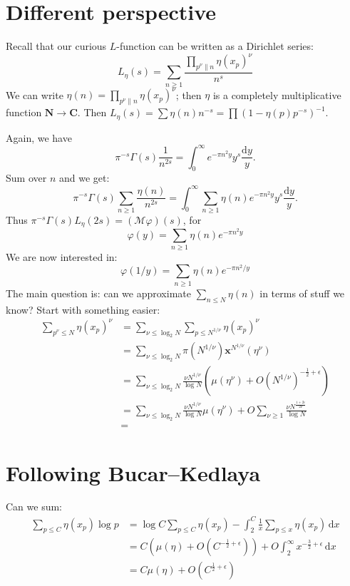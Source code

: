 \documentclass{article}
\newcommand{\bC}{\mathbf{C}}
\newcommand{\bN}{\mathbf{N}}
\newcommand{\bx}{\boldsymbol{x}}
\newcommand{\cM}{\mathcal{M}}
\newcommand{\dd}{\mathrm{d}}
\theoremstyle{definition}
\begin{document}
\section{Different perspective}

Recall that our curious $L$-function can be written as a Dirichlet series:
\[
	L_\eta(s) = \sum_{n\geqslant 1} \frac{\prod_{p^\nu \| n} \eta(x_p)^\nu}{n^s}
\]
We can write $\eta(n) = \prod_{p^\nu\| n} \eta(x_p)^\nu$; then $\eta$ is a 
completely multiplicative function $\bN\to \bC$. Then 
$L_\eta(s) = \sum \eta(n) n^{-s} = \prod (1-\eta(p) p^{-s})^{-1}$. 

Again, we have 
\[
	\pi^{-s} \Gamma(s) \frac{1}{n^{2s}} = \int_0^\infty e^{-\pi n^2 y} y^{s} \frac{\dd y}{y} .
\]
Sum over $n$ and we get:
\[
	\pi^{-s} \Gamma(s) \sum_{n\geqslant 1} \frac{\eta(n)}{n^{2s}} =  \int_0^\infty\sum_{n\geqslant 1} \eta(n) e^{-\pi n^2 y} y^{s} \frac{\dd y}{y} .
\]
Thus $\pi^{-s} \Gamma(s) L_\eta(2s) = (\cM\varphi)(s)$, for 
\[
	\varphi(y) = \sum_{n\geqslant 1} \eta(n) e^{-\pi n^2 y}
\]
We are now interested in:
\[
	\varphi(1/y) = \sum_{n\geqslant 1} \eta(n) e^{-\pi n^2 / y}
\]
The main question is: can we approximate $\sum_{n\leqslant N} \eta(n)$ in terms 
of stuff we know? Start with something easier:
\begin{align*}
	\sum_{p^\nu\leqslant N} \eta(x_p)^\nu
		&= \sum_{\nu\leqslant \log_2 N} \sum_{p\leqslant N^{1/\nu}} \eta(x_p)^\nu \\
		&= \sum_{\nu\leqslant \log_2 N} \pi(N^{1/\nu}) \bx^{N^{1/\nu}}(\eta^\nu) \\
		&= \sum_{\nu\leqslant \log_2 N} \frac{\nu N^{1/\nu}}{\log N} (\mu(\eta^\nu)+O(N^{1/\nu})^{-\frac 1 2+\epsilon}) \\
		&= \sum_{\nu\leqslant \log_2 N} \frac{\nu N^{1/\nu}}{\log N} \mu(\eta^\nu) + O \sum_{\nu\geqslant 1} \frac{\nu N^{\frac{1+2\epsilon}{2\nu}}}{\log N} \\
		&=
\end{align*}





\section{Following Bucar--Kedlaya}

Can we sum:
\begin{align*}
	\sum_{p\leqslant C} \eta(x_p) \log p 
		&= \log C \sum_{p\leqslant C} \eta(x_p) - \int_2^C \frac{1}{x} \sum_{p\leqslant x} \eta(x_p) \, \dd x \\
		&= C (\mu(\eta)+O(C^{-\frac 1 2+\epsilon})) + O \int_2^\infty x^{-\frac 3 2+\epsilon}\, \dd x \\
		&= C \mu(\eta)+ O(C^{\frac 1 2+\epsilon})
\end{align*}





\printbibliography
\end{document}
